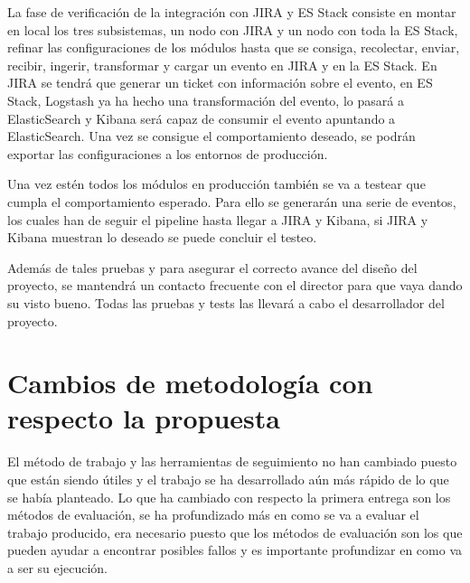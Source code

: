 La fase de verificación de la integración con JIRA y ES Stack consiste en montar en local los tres subsistemas, un nodo con JIRA y un nodo con toda la ES Stack, refinar las configuraciones de los módulos hasta que se consiga, recolectar, enviar, recibir, ingerir, transformar y cargar un evento en JIRA y en la ES Stack. En JIRA se tendrá que generar un ticket con información sobre el evento, en ES Stack, Logstash ya ha hecho una transformación del evento, lo pasará a ElasticSearch y Kibana será capaz de consumir el evento apuntando a ElasticSearch. Una vez se consigue el comportamiento deseado, se podrán exportar las configuraciones a los entornos de producción.

Una vez estén todos los módulos en producción también se va a testear que cumpla el comportamiento esperado. Para ello se generarán una serie de eventos, los cuales han de seguir el pipeline hasta llegar a JIRA y Kibana, si JIRA y Kibana muestran lo deseado se puede concluir el testeo.

Además de tales pruebas y para asegurar el correcto avance del diseño del proyecto, se mantendrá un contacto frecuente con el director para que vaya dando su visto bueno. Todas las pruebas y tests las llevará a cabo el desarrollador del proyecto.

\section{Cambios de metodología con respecto la propuesta}

El método de trabajo y las herramientas de seguimiento no han cambiado puesto que están siendo útiles y el trabajo se ha desarrollado aún más rápido de lo que se había planteado. Lo que ha cambiado con respecto la primera entrega son los métodos de evaluación, se ha profundizado más en como se va a evaluar el trabajo producido, era necesario puesto que los métodos de evaluación son los que pueden ayudar a encontrar posibles fallos y es importante profundizar en como va a ser su ejecución.

